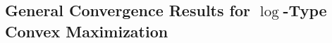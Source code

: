 \documentclass[format=acmsmall,authorversion]{acmart}
\newcommand{\BRC}[1]{{\textcolor{red}{BRC: #1}}}
\newcommand{\ck}[1]{{\textcolor{red}{CK: #1}}}
\begin{document}












\subsection{General Convergence Results for $\log$-Type Convex Maximization} 
\end{document}
